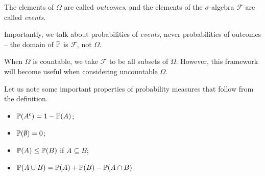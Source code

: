\documentclass{../template/note}
\begin{document}
    \begin{definition}
        The elements of \(\Omega\) are called \emph{outcomes}, and the elements of the \(\sigma\)-algebra \(\mathcal F\) are called \emph{events}.
    \end{definition}
    
    Importantly, we talk about probabilities of \emph{events}, never probabilities of outcomes -- the domain of \(\mathbb P\) is \(\mathcal F\), not \(\Omega\).

    \begin{remark*}
        When \(\Omega\) is countable, we take \(\mathcal F\) to be all subsets of \(\Omega\). However, this framework will become useful when considering uncountable \(\Omega\).
    \end{remark*}
    
    Let us note some important properties of probability measures that follow from the definition.

    \begin{itemize}
        \item \(\mathbb P(A^{\mathsf{c}}) = 1 - \mathbb P(A)\);
        \item \(\mathbb P(\emptyset) = 0\);
        \item \(\mathbb P(A) \leq \mathbb P(B)\) if \(A \subseteq B\);
        \item \(\mathbb P(A \cup B) = \mathbb P(A) + \mathbb P(B) - \mathbb P(A \cap B)\).
    \end{itemize}
    
\end{document}
